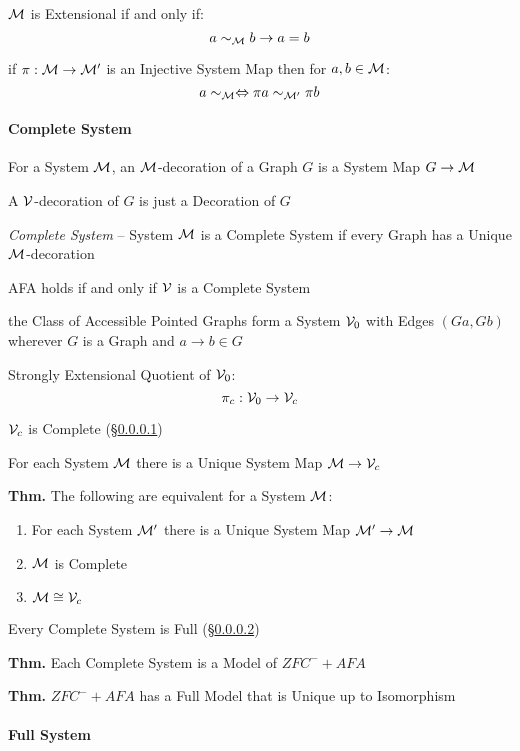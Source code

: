 $\mathcal{M}$ is Extensional if and only if:
\[
  a \sim_\mathcal{M} b \to a = b
\]

if $\pi : \mathcal{M} \to \mathcal{M}'$ is an Injective System Map
then for $a,b \in \mathcal{M}$:
\[
  a \sim_\mathcal{M} \Leftrightarrow \pi a \sim_{\mathcal{M}'} \pi b
\]



\paragraph{Complete System}\label{sec:complete_system}\hfill

For a System $\mathcal{M}$, an $\mathcal{M}$-decoration of a Graph $G$ is
a System Map $G \to \mathcal{M}$

A $\mathcal{V}$-decoration of $G$ is just a Decoration of $G$

\emph{Complete System} -- System $\mathcal{M}$ is a Complete System if
every Graph has a Unique $\mathcal{M}$-decoration

AFA holds if and only if $\mathcal{V}$ is a Complete System

the Class of Accessible Pointed Graphs form a System $\mathcal{V}_0$
with Edges $(G a, G b)$ wherever $G$ is a Graph and $a \to b
\in G$

Strongly Extensional Quotient of $\mathcal{V}_0$:
\[
  \pi_c : \mathcal{V}_0 \to \mathcal{V}_c
\]

$\mathcal{V}_c$ is Complete (\S\ref{sec:complete_system})

For each System $\mathcal{M}$ there is a Unique System Map $\mathcal{M}
\to \mathcal{V}_c$

\textbf{Thm.} The following are equivalent for a System $\mathcal{M}$:
\begin{enumerate}
  \item For each System $\mathcal{M}'$ there is a Unique System Map
    $\mathcal{M}' \to \mathcal{M}$
  \item $\mathcal{M}$ is Complete
  \item $\mathcal{M} \cong \mathcal{V}_c$
\end{enumerate}

Every Complete System is Full (\S\ref{sec:full_system})

\textbf{Thm.} Each Complete System is a Model of $ZFC^- + AFA$

\textbf{Thm.} $ZFC^- + AFA$ has a Full Model that is Unique up to
Isomorphism



\paragraph{Full System}\label{sec:full_system}\hfill

